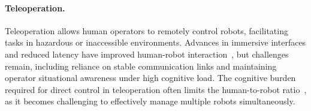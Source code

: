 \paragraph{Teleoperation.}
Teleoperation allows human operators to remotely control robots, facilitating tasks in hazardous or inaccessible environments. Advances in immersive interfaces and reduced latency have improved human-robot interaction~\cite{moniruzzaman2022teleoperation}, but challenges remain, including reliance on stable communication links and maintaining operator situational awareness under high cognitive load. The cognitive burden required for direct control in teleoperation often limits the human-to-robot ratio~\cite{murphy2004human}, as it becomes challenging to effectively manage multiple robots simultaneously.




